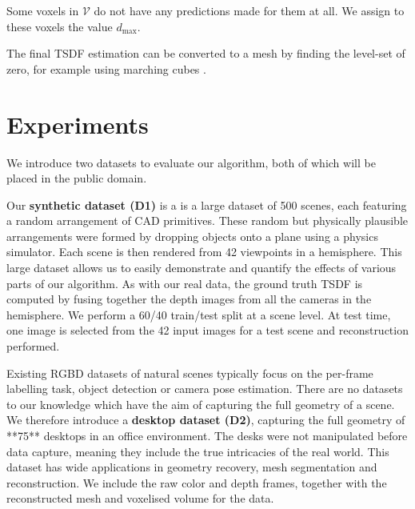 \documentclass[10pt,twocolumn,letterpaper]{article}
\newcommand{\voxelgrid}{\mathcal{V}}
\renewcommand{\paragraph}{\vspace{2pt}\noindent\textbf}
\begin{document}
Some voxels in $\voxelgrid$ do not have any predictions made for them at all.
We assign to these voxels the value $d_{\max}$.

The final TSDF estimation can be converted to a mesh by finding the level-set of zero, for example using marching cubes \cite{lorensen-siggraph-2013}.


\section{Experiments}
We introduce two datasets to evaluate our algorithm, both of which will be placed in the public domain.

Our \textbf{synthetic dataset (D1)} is a is a large dataset of 500 scenes, each featuring a random arrangement of CAD primitives.
These random but physically plausible arrangements were formed by dropping objects onto a plane using a physics simulator. Each scene is then rendered from 42 viewpoints in a hemisphere.
This large dataset allows us to easily demonstrate and quantify the effects of various parts of our algorithm.
As with our real data, the ground truth TSDF is computed by fusing together the depth images from all the cameras in the hemisphere.
We perform a 60/40 train/test split at a scene level.
At test time, one image is selected from the 42 input images for a test scene and reconstruction performed.

Existing RGBD datasets of natural scenes typically focus on the per-frame labelling task, object detection or camera pose estimation.
There are no datasets to our knowledge which have the aim of capturing the full geometry of a scene.
We therefore introduce a \textbf{desktop dataset (D2)}, capturing the full geometry of **75** desktops in an office environment.
The desks were not manipulated before data capture, meaning they include the true intricacies of the real world.
This dataset has wide applications in geometry recovery, mesh segmentation and reconstruction.
We include the raw color and depth frames, together with the reconstructed mesh and voxelised volume for the data.
\end{document}

